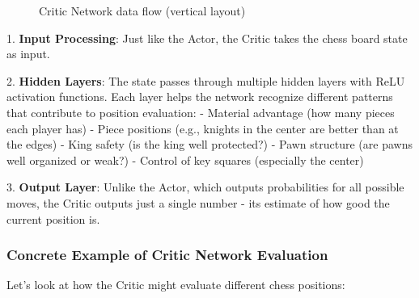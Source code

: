 \documentclass[11pt]{article}
\begin{document}
\begin{figure}[ht]
    \caption{Critic Network data flow (vertical layout)}
    \label{fig:critic_flow}
\end{figure}

1. \textbf{Input Processing}: Just like the Actor, the Critic takes the chess board state as input.

2. \textbf{Hidden Layers}: The state passes through multiple hidden layers with ReLU activation functions. Each layer helps the network recognize different patterns that contribute to position evaluation:
   - Material advantage (how many pieces each player has)
   - Piece positions (e.g., knights in the center are better than at the edges)
   - King safety (is the king well protected?)
   - Pawn structure (are pawns well organized or weak?)
   - Control of key squares (especially the center)

3. \textbf{Output Layer}: Unlike the Actor, which outputs probabilities for all possible moves, the Critic outputs just a single number - its estimate of how good the current position is.

\subsubsection*{Concrete Example of Critic Network Evaluation}

Let's look at how the Critic might evaluate different chess positions:


\end{document}
\end{tikzpicture}
\end{figure}
\end{document}
\end{tikzpicture}
\end{figure}
\end{document}
